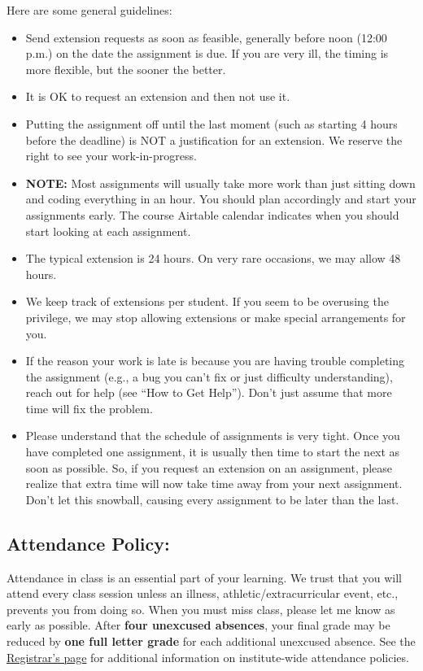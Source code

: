 Here are some general guidelines:
\begin{itemize}
\itemsep0em
\item Send extension requests as soon as feasible, 
generally before noon (12:00 p.m.) on the date the assignment is due. 
If you are very ill, the timing is more flexible, but the sooner the better. 
\item It is OK to request an extension and then not use it. 
\item Putting the assignment off until the last moment 
    (such as starting 4 hours before the deadline) 
    is NOT a justification for an extension.  
    We reserve the right to see your work-in-progress. 
\item \textbf{NOTE:} Most assignments will usually take more work 
    than just sitting down and coding everything in an hour. 
    You should plan accordingly and start your assignments early. 
    The course Airtable calendar indicates when you should start looking at each assignment. 
\item The typical extension is 24 hours. 
    On very rare occasions, we may allow 48 hours. 
\item We keep track of extensions per student.  
    If you seem to be overusing the privilege,  
    we may stop allowing extensions or make special arrangements for you. 
\item If the reason your work is late is because 
    you are having trouble completing the assignment 
    (e.g., a bug you can't fix or just difficulty understanding), 
    reach out for help (see ``How to Get Help''). 
    Don't just assume that more time will fix the problem. 
\item Please understand that the schedule of assignments is very tight. 
    Once you have completed one assignment, 
    it is usually then time to start the next as soon as possible. 
    So, if you request an extension on an assignment, 
    please realize that extra time will now take time away from your next assignment. 
    Don't let this snowball, 
    causing every assignment to be later than the last. 
\end{itemize}

\subsection*{Attendance Policy:}
Attendance in class is an essential part of your learning. 
We trust that you will attend every class session unless 
an illness, athletic/extracurricular event, etc., prevents you from doing so. 
When you must miss class, please let me know as early as possible. 
After \textbf{four unexcused absences}, 
your final grade may be reduced by \textbf{one full letter grade} for each additional unexcused absence.
See the \href{https://catalog.rose-hulman.edu/rules-procedures/attendance/}{Registrar's page} 
for additional information on institute-wide attendance policies. 


